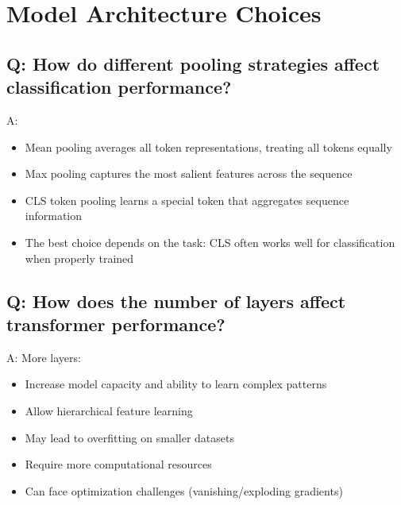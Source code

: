 \section*{Model Architecture Choices}

\subsection*{Q: How do different pooling strategies affect classification performance?}
A:
\begin{itemize}
    \item Mean pooling averages all token representations, treating all tokens equally
    \item Max pooling captures the most salient features across the sequence
    \item CLS token pooling learns a special token that aggregates sequence information
    \item The best choice depends on the task: CLS often works well for classification when properly trained
\end{itemize}

\subsection*{Q: How does the number of layers affect transformer performance?}
A: More layers:
\begin{itemize}
    \item Increase model capacity and ability to learn complex patterns
    \item Allow hierarchical feature learning
    \item May lead to overfitting on smaller datasets
    \item Require more computational resources
    \item Can face optimization challenges (vanishing/exploding gradients)
\end{itemize}
